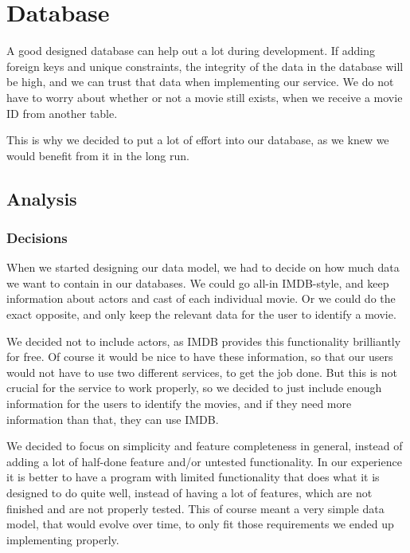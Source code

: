 \section{Database}
\label{Design_Database}
A good designed database can help out a lot during development. If adding foreign keys and unique constraints, the integrity of the data in the database will be high, and we can trust that data when implementing our service. We do not have to worry about whether or not a movie still exists, when we receive a movie ID from another table.

This is why we decided to put a lot of effort into our database, as we knew we would benefit from it in the long run.

\subsection{Analysis}
\label{Design_Database_Analysis}

\subsubsection{Decisions}
\label{Design_Database_Analysis_Decisions}

When we started designing our data model, we had to decide on how much data we want to contain in our databases. We could go all-in IMDB-style, and keep information about actors and cast of each individual movie. Or we could do the exact opposite, and only keep the relevant data for the user to identify a movie.

We decided not to include actors, as IMDB provides this functionality brilliantly for free. Of course it would be nice to have these information, so that our users would not have to use two different services, to get the job done. But this is not crucial for the service to work properly, so we decided to just include enough information for the users to identify the movies, and if they need more information than that, they can use IMDB.

We decided to focus on simplicity and feature completeness in general, instead of adding a lot of half-done feature and/or untested functionality. In our experience it is better to have a program with limited functionality that does what it is designed to do quite well, instead of having a lot of features, which are not finished and are not properly tested. This of course meant a very simple data model, that would evolve over time, to only fit those requirements we ended up implementing properly.

